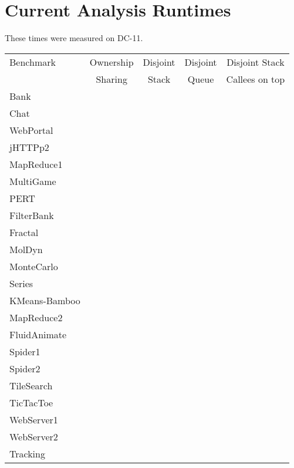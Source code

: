 \documentclass{amsart}[9pt]
\begin{document}
\section{Current Analysis Runtimes}
These times were measured on DC-11.

\begin{tabular}{|l|c|c|c|c|}
\hline
Benchmark     & Ownership & Disjoint & Disjoint & Disjoint Stack \\
              & Sharing   & Stack    & Queue    & Callees on top \\
\hline
Bank          &        &      &      &        \\
Chat          &        &      &      &        \\
WebPortal     &        &      &      &        \\
jHTTPp2       &        &      &      &        \\
MapReduce1    &        &      &      &        \\
MultiGame     &        &      &      &        \\
PERT          &        &      &      &        \\
FilterBank    &        &      &      &        \\
Fractal       &        &      &      &        \\
MolDyn        &        &      &      &        \\
MonteCarlo    &        &      &      &        \\
Series        &        &      &      &        \\
KMeans-Bamboo &        &      &      &        \\
MapReduce2    &        &      &      &        \\
FluidAnimate  &        &      &      &        \\
Spider1       &        &      &      &        \\
Spider2       &        &      &      &        \\
TileSearch    &        &      &      &        \\
TicTacToe     &        &      &      &        \\
WebServer1    &        &      &      &        \\
WebServer2    &        &      &      &        \\
Tracking      &        &      &      &        \\
\hline
\end{tabular}
\end{document}
